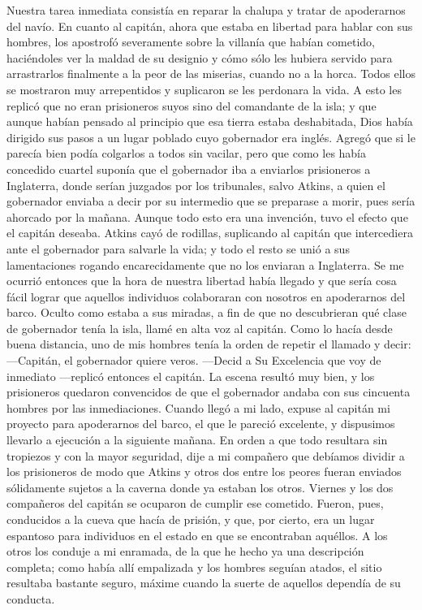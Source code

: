 \documentclass{novela}
\begin{document}
    Nuestra tarea inmediata consistía en reparar la chalupa y tratar de apoderarnos del navío. En cuanto al capitán, ahora que estaba en libertad para hablar con sus hombres, los apostrofó severamente sobre la villanía que habían cometido, haciéndoles ver la maldad de su designio y cómo sólo les hubiera servido para arrastrarlos finalmente a la peor de las miserias, cuando no a la horca.
    Todos ellos se mostraron muy arrepentidos y suplicaron se les perdonara la vida. A esto les replicó que no eran prisioneros suyos sino del comandante de la isla; y que aunque habían pensado al principio que esa tierra estaba deshabitada, Dios había dirigido sus pasos a un lugar poblado cuyo gobernador era inglés. Agregó que si le parecía bien podía colgarlos a todos sin vacilar, pero que como les había concedido cuartel suponía que el gobernador iba a enviarlos prisioneros a Inglaterra, donde serían juzgados por los tribunales, salvo Atkins, a quien el gobernador enviaba a decir por su intermedio que se preparase a morir, pues sería ahorcado por la mañana.
    Aunque todo esto era una invención, tuvo el efecto que el capitán deseaba. Atkins cayó de rodillas, suplicando al capitán que intercediera ante el gobernador para salvarle la vida; y todo el resto se unió a sus lamentaciones rogando encarecidamente que no los enviaran a Inglaterra.
    Se me ocurrió entonces que la hora de nuestra libertad había llegado y que sería cosa fácil lograr que aquellos individuos colaboraran con nosotros en apoderarnos del barco. Oculto como estaba a sus miradas, a fin de que no descubrieran qué clase de gobernador tenía la isla, llamé en alta voz al capitán. Como lo hacía desde buena distancia, uno de mis hombres tenía la orden de repetir el llamado y decir:
    —Capitán, el gobernador quiere veros.
    —Decid a Su Excelencia que voy de inmediato —replicó entonces el capitán.
    La escena resultó muy bien, y los prisioneros quedaron convencidos de que el gobernador andaba con sus cincuenta hombres por las inmediaciones.
    Cuando llegó a mi lado, expuse al capitán mi proyecto para apoderarnos del barco, el que le pareció excelente, y dispusimos llevarlo a ejecución a la siguiente mañana. En orden a que todo resultara sin tropiezos y con la mayor seguridad, dije a mi compañero que debíamos dividir a los prisioneros de modo que Atkins y otros dos entre los peores fueran enviados sólidamente sujetos a la caverna donde ya estaban los otros. Viernes y los dos compañeros del capitán se ocuparon de cumplir ese cometido.
    Fueron, pues, conducidos a la cueva que hacía de prisión, y que, por cierto, era un lugar espantoso para individuos en el estado en que se encontraban aquéllos. A los otros los conduje a mi enramada, de la que he hecho ya una descripción completa; como había allí empalizada y los hombres seguían atados, el sitio resultaba bastante seguro, máxime cuando la suerte de aquellos dependía de su conducta.
\end{document}
